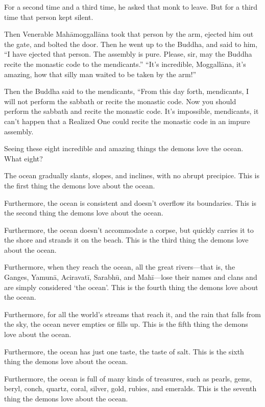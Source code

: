 \documentclass[12pt,openany]{book}%
\begin{document}
For a second time and a third time, he asked that monk to leave. But for a third time that person kept silent. 

Then Venerable \textsanskrit{Mahāmoggallāna} took that person by the arm, ejected him out the gate, and bolted the door. Then he went up to the Buddha, and said to him, “I have ejected that person. The assembly is pure. Please, sir, may the Buddha recite the monastic code to the mendicants.” “It’s incredible, \textsanskrit{Moggallāna}, it’s amazing, how that silly man waited to be taken by the arm!” 

Then the Buddha said to the mendicants, “From this day forth, mendicants, I will not perform the sabbath or recite the monastic code. Now you should perform the sabbath and recite the monastic code. It’s impossible, mendicants, it can’t happen that a Realized One could recite the monastic code in an impure assembly. 

Seeing these eight incredible and amazing things the demons love the ocean. What eight? 

The ocean gradually slants, slopes, and inclines, with no abrupt precipice. This is the first thing the demons love about the ocean. 

Furthermore, the ocean is consistent and doesn’t overflow its boundaries. This is the second thing the demons love about the ocean. 

Furthermore, the ocean doesn’t accommodate a corpse, but quickly carries it to the shore and strands it on the beach. This is the third thing the demons love about the ocean. 

Furthermore, when they reach the ocean, all the great rivers—that is, the Ganges, \textsanskrit{Yamunā}, \textsanskrit{Aciravatī}, \textsanskrit{Sarabhū}, and \textsanskrit{Mahī}—lose their names and clans and are simply considered ‘the ocean’. This is the fourth thing the demons love about the ocean. 

Furthermore, for all the world’s streams that reach it, and the rain that falls from the sky, the ocean never empties or fills up. This is the fifth thing the demons love about the ocean. 

Furthermore, the ocean has just one taste, the taste of salt. This is the sixth thing the demons love about the ocean. 

Furthermore, the ocean is full of many kinds of treasures, such as pearls, gems, beryl, conch, quartz, coral, silver, gold, rubies, and emeralds. This is the seventh thing the demons love about the ocean. 
\end{document}

